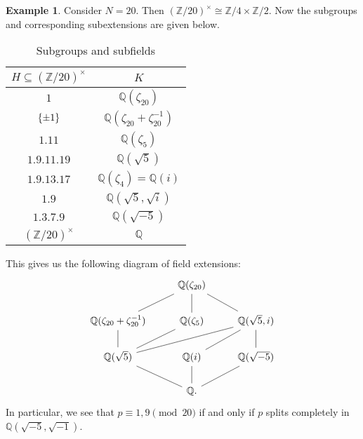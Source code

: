 \documentclass[leqno, openany]{memoir}
\theoremstyle{definition}
\newtheorem{exm}[thm]{Example}
\theoremstyle{remark}
\theoremstyle{plain}
\theoremstyle{definition}
\theoremstyle{remark}
\newcommand{\Z}{\mathbb{Z}}
\newcommand{\Q}{\mathbb{Q}}
\begin{document}
\begin{exm} Consider $N = 20$. Then ${(\Z/20)}^{\times} \cong \Z/4 \times
    \Z/2$. Now the subgroups and corresponding subextensions are given below.
    \begin{table}[H] \centering \caption{Subgroups and subfields}
        \label{tab:label} \begin{tabular}{cc} \toprule $H \subseteq
            {(\Z/20)}^{\times}$ & $K$ \\ \midrule $\qty{1}$ & $\Q(\zeta_{20})$
            \\ $\qty{\pm 1}$ & $\Q(\zeta_{20}+\zeta_{20}^{-1})$ \\ $\qty{1,11}$
                             & $\Q(\zeta_5)$ \\ $\qty{1,9,11,19}$ &
                             $\Q(\sqrt{5})$ \\ $\qty{1,9,13,17}$ & $\Q(\zeta_4)
                         = \Q(i)$ \\ $\qty{1,9}$ & $\Q(\sqrt{5}, \sqrt{i})$ \\
                     $\qty{1,3,7,9}$ & $\Q(\sqrt{-5})$ \\ ${(\Z/20)}^{\times}$
                                     & $\Q$ \\ \bottomrule \end{tabular}
                                 \end{table} This gives us the following
                                 diagram of field extensions: \begin{equation*}
                                     \begin{tikzcd} & \Q(\zeta_{20})
                                         \ar[dash]{d} \ar[dash]{dl}
                                         \ar[dash]{dr} \\ \Q(\zeta_{20} +
                                         \zeta_{20}^{-1}) \ar[dash]{d} &
                                         \Q(\zeta_5) \ar[dash]{dl} &
                                         \Q(\sqrt{5}, i) \ar[dash]{dll}
                                         \ar[dash]{dl} \ar[dash]{d} \\
                                     \Q(\sqrt{5}) \ar[dash]{dr} & \Q(i)
                                 \ar[dash]{d} & \Q(\sqrt{-5}) \ar[dash]{dl} \\
                                              & \Q.  \end{tikzcd}
                                     \end{equation*} In particular, we see that
                                     $p \equiv 1,9 \pmod{20}$ if and only if
                                     $p$ splits completely in $\Q(\sqrt{-5},
                                     \sqrt{-1})$.  \end{exm}
\end{document}
